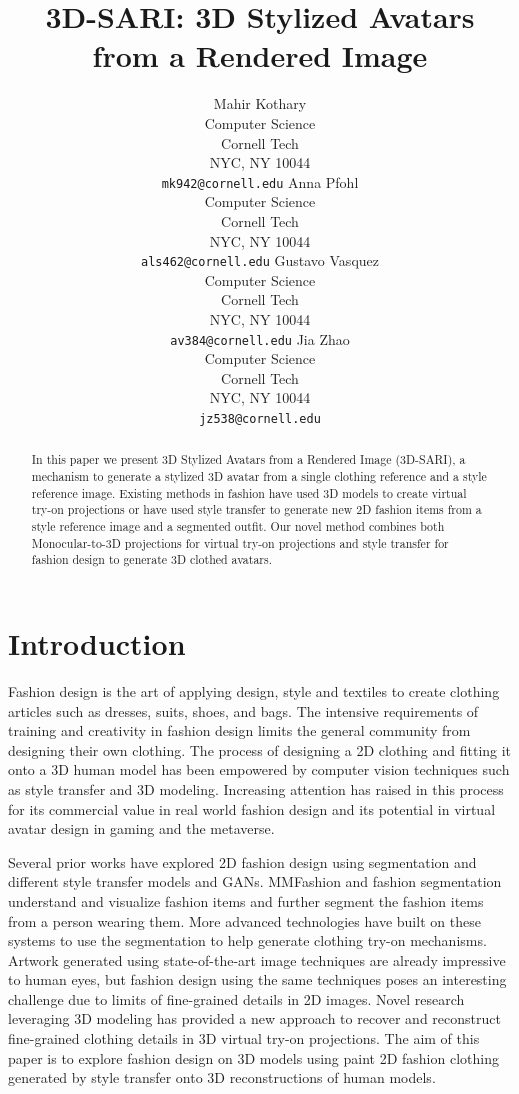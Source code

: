 \documentclass{article}
\title{3D-SARI: 3D Stylized Avatars from a Rendered Image}
\author{%
  Mahir Kothary\\
  Computer Science\\
  Cornell Tech\\
  NYC, NY 10044 \\
  \texttt{mk942@cornell.edu} 
 \And Anna Pfohl\\
  Computer Science\\
  Cornell Tech\\
  NYC, NY 10044 \\
  \texttt{als462@cornell.edu}
\AND
  Gustavo Vasquez \\
  Computer Science\\
  Cornell Tech\\
  NYC, NY 10044 \\
  \texttt{av384@cornell.edu}
\And
  Jia Zhao \\
  Computer Science\\
  Cornell Tech\\
  NYC, NY 10044 \\
  \texttt{jz538@cornell.edu}
}
\begin{document}
\maketitle


\begin{abstract}
In this paper we present 3D Stylized Avatars from a Rendered Image (3D-SARI), a mechanism to generate a stylized 3D avatar from a single clothing reference and a style reference image. Existing methods in fashion have used 3D models to create virtual try-on projections or have used style transfer to generate new 2D fashion items from a style reference image and a segmented outfit. Our novel method combines both Monocular-to-3D projections for virtual try-on projections and style transfer for fashion design to generate 3D clothed avatars.
\end{abstract}

\section{Introduction}
Fashion design is the art of applying design, style and textiles to create clothing articles such as dresses, suits, shoes, and bags. The intensive requirements of training and creativity in fashion design limits the general community from designing their own clothing. The process of designing a 2D clothing and fitting it onto a 3D human model has been empowered by computer vision techniques such as style transfer and 3D modeling. Increasing attention has raised in this process for its commercial value in real world fashion design and its potential in virtual avatar design in gaming and the metaverse.

Several prior works have explored 2D fashion design using segmentation and different style transfer models and GANs. MMFashion\cite{liu2021fashionVisTool} and fashion segmentation\cite{wang2020fashionSegmentation} understand and visualize fashion items and further segment the fashion items from a person wearing them. More advanced technologies have built on these systems to use the segmentation to help generate clothing try-on mechanisms\cite{Pang2021tryon, Tiwari2021tryon}. Artwork generated using state-of-the-art image techniques are already impressive to human eyes, but fashion design using the same techniques poses an interesting challenge due to limits of fine-grained details in 2D images. Novel research leveraging 3D modeling has provided a new approach to recover and reconstruct fine-grained clothing details in 3D virtual try-on projections. The aim of this paper is to explore fashion design on 3D models using  paint 2D fashion clothing generated by style transfer onto 3D reconstructions of human models.  
\end{document}
